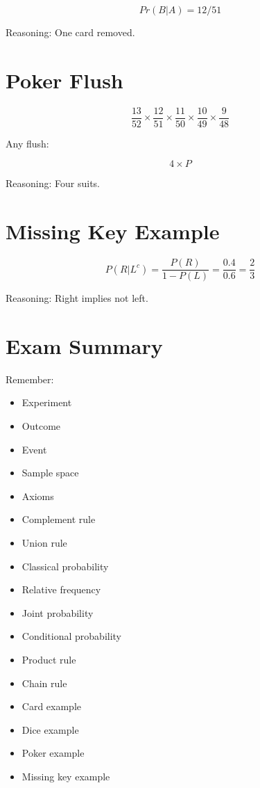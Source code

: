 \documentclass[12pt]{article}
\begin{document}
\[
Pr(B|A) = 12/51
\]

Reasoning: One card removed.

\section{Poker Flush}

\[
\frac{13}{52}
\times
\frac{12}{51}
\times
\frac{11}{50}
\times
\frac{10}{49}
\times
\frac{9}{48}
\]

Any flush:

\[
4 \times P
\]

Reasoning: Four suits.

\section{Missing Key Example}

\[
P(R|L^c)
=
\frac{P(R)}{1-P(L)}
=
\frac{0.4}{0.6}
=
\frac{2}{3}
\]

Reasoning: Right implies not left.

\section{Exam Summary}

Remember:

\begin{itemize}
\item Experiment
\item Outcome
\item Event
\item Sample space
\item Axioms
\item Complement rule
\item Union rule
\item Classical probability
\item Relative frequency
\item Joint probability
\item Conditional probability
\item Product rule
\item Chain rule
\item Card example
\item Dice example
\item Poker example
\item Missing key example
\end{itemize}
\end{document}
